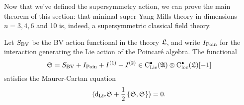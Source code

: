 \documentclass[10pt, oneside]{article}
\begin{document}
Now that we've defined the supersymmetry action, we can prove the main theorem of this section: that minimal super Yang-Mills theory in dimensions $n=3,4,6$ and 10 is, indeed, a supersymmetric classical field theory.

\begin{theorem} \label{SUSY_YM_theorem}
Let $S_{\mathrm{BV}}$ be the BV action functional in the theory $\mathfrak L$, and write $I_{\mathrm{Poin}}$ for the interaction generating the Lie action of the Poincar\'e algebra. The functional
\[\mathfrak S = S_{\mathrm{BV}} + I_{\mathrm{Poin}} + I^{(1)} + I^{(2)} \in {\rm C}_{\rm Lie}^\bullet(\mathfrak{A}) \otimes {\rm C}_{\rm loc}^\bullet(\mathfrak L) [-1]\]
satisfies the Maurer-Cartan equation
\begin{equation} 
\label{nd_MC}
({\rm d}_{\rm Lie} \mathfrak S + \frac{1}{2} \left\{\mathfrak S , \mathfrak S \right\}) = 0 .
\end{equation}
\end{theorem}
\end{document}
